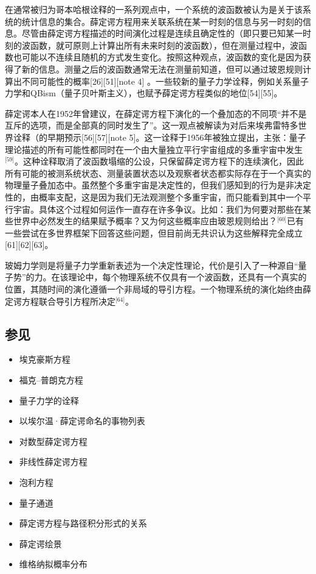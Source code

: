 在通常被归为哥本哈根诠释的一系列观点中，一个系统的波函数被认为是关于该系统的统计信息的集合。薛定谔方程用来关联系统在某一时刻的信息与另一时刻的信息。尽管由薛定谔方程描述的时间演化过程是连续且确定性的（即只要已知某一时刻的波函数，就可原则上计算出所有未来时刻的波函数），但在测量过程中，波函数也可能以不连续且随机的方式发生变化。按照这种观点，波函数的变化是因为获得了新的信息。测量之后的波函数通常无法在测量前知道，但可以通过玻恩规则计算出不同可能性的概率[26][51][note 4] 。一些较新的量子力学诠释，例如关系量子力学和QBism（量子贝叶斯主义），也赋予薛定谔方程类似的地位[54][55]。

薛定谔本人在1952年曾建议，在薛定谔方程下演化的一个叠加态的不同项“并不是互斥的选项，而是全部真的同时发生了”。这一观点被解读为对后来埃弗雷特多世界诠释（的早期预示[56][57][note 5]。这一诠释于1956年被独立提出，主张：量子理论描述的所有可能性都同时在一个由大量独立平行宇宙组成的多重宇宙中发生\(^\text{[59]}\)。这种诠释取消了波函数塌缩的公设，只保留薛定谔方程下的连续演化，因此所有可能的被测系统状态、测量装置状态以及观察者状态都实际存在于一个真实的物理量子叠加态中。虽然整个多重宇宙是决定性的，但我们感知到的行为是非决定性的，由概率支配，这是因为我们无法观测整个多重宇宙，而只能看到其中一个平行宇宙。具体这个过程如何运作一直存在许多争议。比如：我们为何要对那些在某些世界中必然发生的结果赋予概率？又为何这些概率应由玻恩规则给出？\(^\text{[60]}\)已有一些尝试在多世界框架下回答这些问题，但目前尚无共识认为这些解释完全成立[61][62][63]。

玻姆力学则是将量子力学重新表述为一个决定性理论，代价是引入了一种源自“量子势”的力。在该理论中，每个物理系统不仅具有一个波函数，还具有一个真实的位置，其随时间的演化遵循一个非局域的导引方程。一个物理系统的演化始终由薛定谔方程联合导引方程所决定\(^\text{[64]}\)。
\subsection{参见}
\begin{itemize}
\item 埃克豪斯方程
\item 福克–普朗克方程
\item 量子力学的诠释
\item 以埃尔温·薛定谔命名的事物列表
\item 对数型薛定谔方程
\item 非线性薛定谔方程
\item 泡利方程
\item 量子通道
\item 薛定谔方程与路径积分形式的关系
\item 薛定谔绘景
\item 维格纳拟概率分布
\end{itemize}
